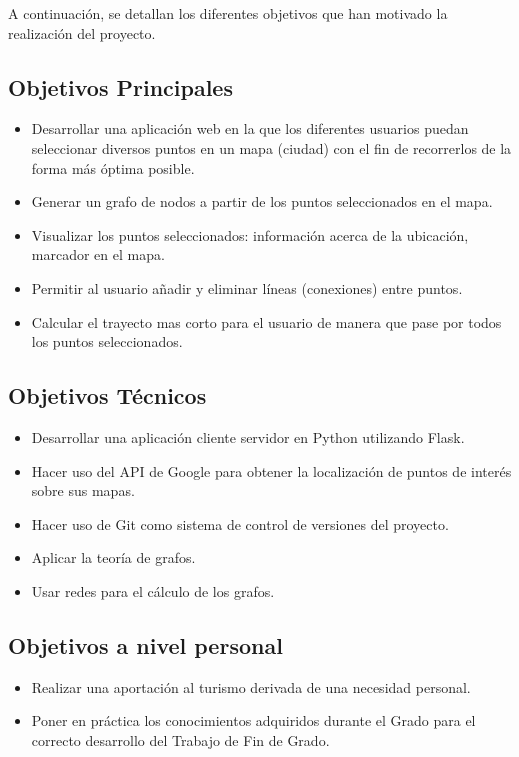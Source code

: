 
A continuación, se detallan los diferentes objetivos que han motivado la
realización del proyecto.

\subsection{Objetivos Principales}

\begin{itemize}
	\item Desarrollar una aplicación web en la que los diferentes usuarios puedan seleccionar diversos puntos en un mapa (ciudad) con el fin de recorrerlos de la forma más óptima posible.
	\item Generar un grafo de nodos a partir de los puntos seleccionados en el mapa.
	\item Visualizar los puntos seleccionados: información acerca de la ubicación, marcador en el mapa.
	\item Permitir al usuario añadir y eliminar líneas (conexiones) entre puntos.
	\item Calcular el trayecto mas corto para el usuario de manera que pase por todos los puntos seleccionados.
\end{itemize}

\subsection{Objetivos Técnicos}
\begin{itemize}
	\item Desarrollar una aplicación cliente servidor en Python utilizando Flask.
	\item Hacer uso del API de Google para obtener la localización de puntos de interés sobre sus mapas.
	\item Hacer uso de Git como sistema de control de versiones del proyecto.
	\item Aplicar la teoría de grafos.
	\item Usar redes para el cálculo de los grafos.
\end{itemize}
\subsection{Objetivos a nivel personal}
\begin{itemize}
	\item Realizar una aportación al turismo derivada de una necesidad personal.
	\item Poner en práctica los conocimientos adquiridos durante el Grado para el correcto desarrollo del Trabajo de Fin de Grado.
\end{itemize}

